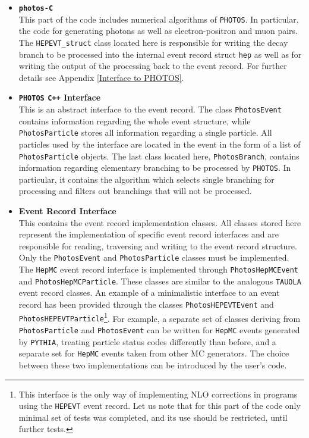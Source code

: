 \documentclass[]{Photos_interface_design}
\begin{document}
\begin{itemize}
  \item {\bf {\tt photos-C} }\\
       This part of the code includes numerical algorithms of {\tt PHOTOS}. In particular,
       the code for generating photons as well as electron-positron and muon pairs.
       The {\tt HEPEVT\_struct} class located here is responsible for writing
       the decay branch to be processed into the internal event record struct {\tt hep} as
       well as for writing the output of the processing back to the event record.
       For further details see Appendix \ref{Interface to PHOTOS}.
  \item {\bf {\tt PHOTOS} {\tt C++} Interface} \\
       This is an abstract interface to the event record.
       The class {\tt PhotosEvent} contains information regarding the whole event
       structure, while {\tt PhotosParticle} stores all information regarding a single particle.
       All particles used by the interface are located in the event in the form of
       a list of {\tt PhotosParticle} objects.
       The last class located here, {\tt PhotosBranch}, contains information regarding
       elementary branching to be processed by {\tt PHOTOS}. In particular, 
       it contains the algorithm
       which selects single branching for processing and filters out branchings that will not be processed.
  \item {\bf Event Record Interface} \\
       This contains the event record implementation classes. All classes stored here represent
       the implementation of specific event record interfaces and are responsible for reading,
       traversing and writing to the event record structure.
       Only the {\tt PhotosEvent} and {\tt PhotosParticle} classes must be implemented.
       The {\tt HepMC} event record interface is implemented
       through {\tt PhotosHepMCEvent} and {\tt PhotosHepMCParticle}. These classes are similar to the
       analogous {\tt TAUOLA} \cite{Davidson:2010rw} event record classes.
       An example of a minimalistic interface to an event record has been provided
       through the classes {\tt PhotosHEPEVTEvent} and {\tt PhotosHEPEVTParticle}\footnote{This interface is the 
       only way of implementing NLO corrections in programs using the {\tt HEPEVT} event record.
       Let us note that for this part of the code only minimal set of  tests was completed, and its use should be restricted, until further tests.}.
       For example, a separate set of classes deriving from {\tt PhotosParticle} and {\tt PhotosEvent}
       can be written for {\tt HepMC} events generated by {\tt PYTHIA}, treating particle status codes
       differently than before, and a separate set for {\tt HepMC} events taken from other MC generators.
       The choice between these two implementations can be introduced by the user's code.
\end{itemize}
\end{document}

